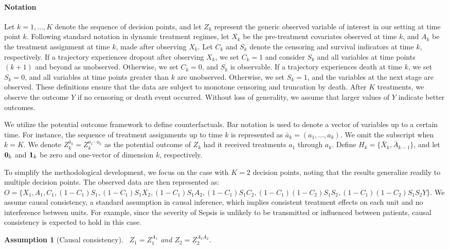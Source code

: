 \documentclass{article}
\newcommand{\tred}{{}}   %
\newtheorem{assumption}{Assumption}
\begin{document}
\paragraph{Notation}
Let $k = 1, \dots, K$ denote the sequence of decision points, and let $Z_k$ represent the generic observed variable of interest in our setting at time point $k$.
Following standard notation in dynamic treatment regimes, let $X_k$ be the pre-treatment covariates observed at time $k$, and $A_k$ be the treatment assignment at time $k$, made after observing $X_k$. 
Let $C_k$ and $S_k$ denote the censoring and survival indicators at time $k$, respectively. If a trajectory experiences dropout after observing $X_k$, we set $C_k = 1$ and consider $S_k$ and all variables at time points $(k+1)$ and beyond as unobserved. Otherwise, we set $C_k = 0$, and $S_k$ is observable. If a trajectory experiences death at time $k$, we set $S_k = 0$, and all variables at time points greater than $k$ are unobserved. Otherwise, we set $S_k = 1$, and the variables at the next stage are observed. These definitions ensure that the data are subject to monotone censoring and truncation by death. After $K$ treatments, we observe the outcome $Y$ if no censoring or death event occurred. Without loss of generality, we assume that larger values of $Y$ indicate better outcomes.

We utilize the potential outcome framework to define counterfactuals. Bar notation is used to denote a vector of variables up to a certain time. For instance, the sequence of treatment assignments up to time $k$ is represented as $\bar a_k = (a_1, \dots, a_k)$. We omit the subscript when $k = K$. We denote $Z_k^{\bar a_k} = Z_k^{a_1 \cdots a_k}$ as the potential outcome of $Z_k$ had it received treatments $a_1$ through $a_k$. Define $H_k = \{\bar X_k, \bar A_{k-1}\}$, and let ${\bf0}_k$ and ${\bf1}_k$ be zero and one-vector of dimension $k$, respectively.

To simplify the methodological development, we focus on the case with $K = 2$ decision points, noting that the results generalize readily to multiple decision points. The observed data are then represented as:
$
O = \{ X_1, A_1, C_1, (1-C_1)S_1, (1-C_1)S_1X_2, (1-C_1)S_1A_2, (1-C_1)S_1C_2, (1-C_1)(1-C_2)S_1S_2, (1-C_1)(1-C_2)S_1S_2Y \}.
$
We assume causal consistency, a standard assumption in causal inference, which implies consistent treatment effects on each unit and no interference between units. \tred{For example, since the severity of Sepsis is unlikely to be transmitted or influenced between patients, causal consistency is expected to hold in this case.}
	\begin{assumption}[Causal consistency] \label{A1} \
		$Z_1 = Z_1^{A_1}$ and $Z_2 = Z_2^{A_1A_2}.$ 
	\end{assumption}
\end{document}
